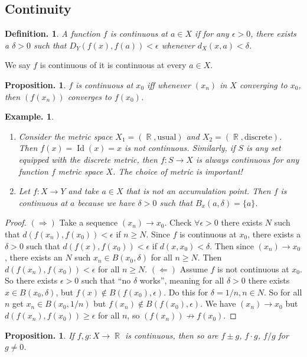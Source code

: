 \documentclass[11pt, a4paper]{memoir}
\DeclareMathOperator{\R}{{\mathbb{R}}}
\theoremstyle{change}
\newtheorem{proposition}[theorem]{Proposition.}
\theoremstyle{plain}
\theoremstyle{nonumberplain}
\newtheorem{definition}{Definition.}
\newtheorem{example}{Example.}
\newtheorem{proof}{Proof}
\DeclareMathOperator{\Id}{Id}
\numberwithin{equation}{section}
\begin{document}
\subsection{Continuity}
\begin{definition}
    A function $f$ is continuous at $a\in X$ if for any $\epsilon>0$, there exists a $\delta>0$ such that $D_Y(f(x),f(a))<\epsilon$
    whenever $d_X(x,a)<\delta$.
\end{definition}
We say $f$ is continuous of it is continuous at every $a\in X$.
\begin{proposition}
    $f$ is continuous at $x_0$ iff whenever $(x_n)$ in $X$ converging to $x_0$, then $(f(x_n))$ converges to $f(x_0)$.
\end{proposition}
\begin{example}
    \begin{enumerate}
        \item Consider the metric space $X_1=(\R,\text{usual})$ and $X_2=(\R,\text{discrete})$. Then $f(x)=\Id(x)=x$
            is not continuous. Similarly, if $S$ is any set equipped with the discrete metric, then $f:S\to X$ is
            always continuous for any function $f$ metric space $X$. The choice of metric is important!
        \item Let $f:X\to Y$ and take $a\in X$ that is not an accumulation point. Then $f$ is continuous at $a$ because
            we have $\delta>0$ such that $B_x(a,\delta)=\{a\}$.
    \end{enumerate}
\end{example}
\begin{proof}
    $(\Rightarrow)$ Take a sequence $(x_n)\to x_0$. Check $\forall\epsilon>0$ there exists $N$ such that $d(f(x_n),f(x_0))<\epsilon$
    if $n\geq N$. Since $f$ is continuous at $x_0$, there exists a $\delta>0$ such that $d(f(x),f(x_0))<\epsilon$ if $d(x,x_0)<\delta$.
    Then since $(x_n)\to x_0$, there exists an $N$ such $x_n\in B(x_0,\delta)$ for all $n\geq N$. Then $d(f(x_n),f(x_0))<\epsilon$
    for all $n\geq N$.
    $(\Leftarrow)$ Assume $f$ is not continuous at $x_0$. So there exists $\epsilon>0$ such that ``no $\delta$ works'',
    meaning for all $\delta>0$ there exists $x\in B(x_0,\delta)$, but $f(x)\notin B(f(x_0),\epsilon)$. Do this for
    $\delta=1/n,n\in N$. So for all $n$ get $x_n\in B(x_0,1/n)$ but $f(x_n)\notin B(f(x_0),\epsilon)$. We have $(x_n)\to x_0$
    but $d(f(x_n),f(x_0))\geq\epsilon$ for all $n$, so $(f(x_n))\not\to f(x_0)$.
\end{proof}
\begin{proposition}
    If $f,g:X\to\R$ is continuous, then so are $f\pm g$, $f\cdot g$, $f/g$ for $g\neq 0$.
\end{proposition}
\end{document}
